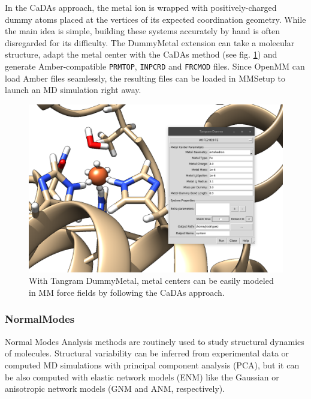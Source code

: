 In the CaDAs approach, the metal ion is wrapped with positively-charged dummy atoms placed at the vertices of its expected coordination geometry. While the main idea is simple, building these systems accurately by hand is often disregarded for its difficulty. The DummyMetal extension can take a molecular structure, adapt the metal center with the CaDAs method (see fig. \ref{fig:tangram-dummy}) and generate Amber-compatible \texttt{PRMTOP}, \texttt{INPCRD} and \texttt{FRCMOD} files. Since OpenMM can load Amber files seamlessly, the resulting files can be loaded in MMSetup to launch an MD simulation right away.

\begin{figure}
	\begin{Center}
		\includegraphics[width=\textwidth]{./figures/05/tangram_dummy.png}
	\end{Center}
	\caption[Tangram DummyMetal]{With Tangram DummyMetal, metal centers can be easily modeled in MM force fields by following the CaDAs approach.}
	\label{fig:tangram-dummy}
\end{figure}

\subsubsection{NormalModes}
Normal Modes Analysis methods are routinely used to study structural dynamics of molecules. Structural variability can be inferred from experimental data or computed MD simulations with principal component analysis (PCA), but it can be also computed with elastic network models (ENM) like the Gaussian or anisotropic network models (GNM and ANM, respectively).

